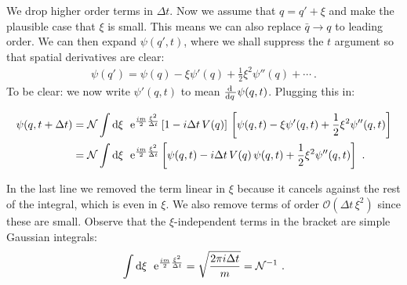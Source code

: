 \documentclass[12pt, oneside]{report}    %
\newenvironment{wide}{\begin{adjustwidth}{0cm}{-6.25cm}}{\end{adjustwidth}}
\begin{document}
We drop higher order terms in $\Delta t$.
Now we assume that $q= q' + \xi$ and make the plausible case that $\xi$ is small. This means we can also replace $\bar q \to q$ to leading order.
We can then expand $\psi(q',t)$, where we shall suppress the $t$ argument so that spatial derivatives are clear:
\begin{align}
    \psi(q') = \psi(q) -\xi \psi'(q) + \frac{1}{2}\xi^2 \psi''(q) + \cdots \ .
\end{align}
To be clear: we now write $\psi'(q,t)$ to mean $\frac{\operatorname{d}\mkern-3mu^{}\mkern-1mu{}\,}{\operatorname{d}\mkern-3mu^{}\mkern-1mu{q}\,}\psi(q,t)$.
Plugging this in:
\begin{wide}
\begin{align}
    \psi(q,t+\Delta t) &= 
    \mathcal N\int \operatorname{d}\mkern-3mu^{}\mkern-1mu{\xi}\,\; 
    \operatorname{e}^{\frac{im}{2}\frac{\xi^2}{\Delta t}} 
    \left[1 - i\Delta t \, V(q)\right]\,
    \left[\psi(q,t) -\xi \psi'(q,t) + \frac{1}{2}\xi^2 \psi''(q,t)\right] 
    \\
    &= 
    \mathcal N\int \operatorname{d}\mkern-3mu^{}\mkern-1mu{\xi}\,\; 
    \operatorname{e}^{\frac{im}{2}\frac{\xi^2}{\Delta t}} 
    \left[\psi(q,t) - i\Delta t \, V(q)\,\psi(q,t)
    + \frac{1}{2}\xi^2 \psi''(q,t)
    \right]
    \ .
 \label{eq:psi:path:integral:schrodinger:intermediate}
\end{align}
\end{wide}
In the last line we removed the term linear in $\xi$ because it cancels against the rest of the integral, which is even in $\xi$. We also remove terms of order $\mathcal O(\Delta t\,\xi^2)$ since these are small. Observe that the $\xi$-independent terms in the bracket are simple Gaussian integrals:
\begin{align}
    \int \operatorname{d}\mkern-3mu^{}\mkern-1mu{\xi}\,\; 
    \operatorname{e}^{\frac{im}{2}\frac{\xi^2}{\Delta t}} 
    = 
    \sqrt{\frac{2\pi i\Delta t}{m}} = \mathcal{N}^{-1} \ .
    \label{eq:path:integral:Gaussian:trick:1}
\end{align}
\end{document}
